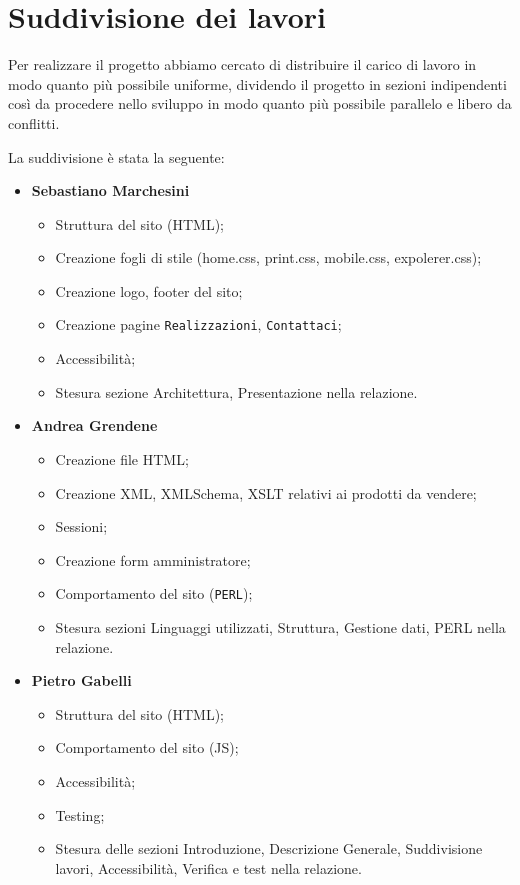 \section{Suddivisione dei lavori}{
	Per realizzare il progetto abbiamo cercato di distribuire il carico di lavoro in modo quanto più possibile uniforme, dividendo il progetto in sezioni indipendenti così da procedere nello sviluppo in modo quanto più possibile parallelo e libero da conflitti.
	
	La suddivisione è stata la seguente: 	
	\begin{itemize}\itemsep1pt
		\item \textbf{Sebastiano Marchesini} 
		\begin{itemize}\itemsep1pt
			\item Struttura del sito (HTML);
			\item Creazione fogli di stile (home.css, print.css, mobile.css, expolerer.css);
			\item Creazione logo, footer del sito;
			\item Creazione pagine \texttt{Realizzazioni}, \texttt{Contattaci};
			\item Accessibilità;
			\item Stesura sezione Architettura, Presentazione nella relazione.
		\end{itemize}
		\item \textbf{Andrea Grendene}
		\begin{itemize}\itemsep1pt
			\item Creazione file HTML;
			\item Creazione XML, XMLSchema, XSLT relativi ai prodotti da vendere;
			\item Sessioni;
			\item Creazione form amministratore;
			\item Comportamento del sito (\texttt{PERL});
			\item Stesura sezioni Linguaggi utilizzati, Struttura, Gestione dati,  PERL nella relazione.
		\end{itemize}
		\item \textbf{Pietro Gabelli}
		\begin{itemize}\itemsep1pt
			\item Struttura del sito (HTML);
			\item Comportamento del sito (JS);
			\item Accessibilità;
			\item Testing;
			\item Stesura delle sezioni Introduzione, Descrizione Generale, Suddivisione lavori,  Accessibilità, Verifica e test nella relazione.
		\end{itemize}
	\end{itemize}
}